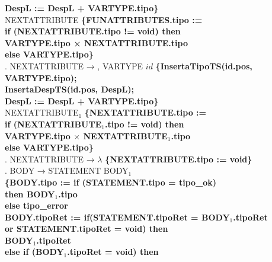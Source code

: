 \begin{tabbing}
    \>                    \>        \>\textbf{DespL := DespL + VARTYPE.tipo\}}\\
    \>                    \>NEXTATTRIBUTE \textbf{\{FUNATTRIBUTES.tipo :=}\\
    \>                    \>                      \> \textbf{if (NEXTATTRIBUTE.tipo != void) then}\\
    \>                    \>                      \> \>\textbf{VARTYPE.tipo × NEXTATTRIBUTE.tipo}\\
    \>                    \>                      \> \textbf{else VARTYPE.tipo\}}\\
    . NEXTATTRIBUTE → , VARTYPE $id$ \textbf{\{InsertaTipoTS(id.pos, VARTYPE.tipo);}\\
    \>                    \>        \>\textbf{InsertaDespTS(id.pos, DespL);}\\
    \>                    \>        \>\textbf{DespL := DespL + VARTYPE.tipo\}}\\
    \>                    \>NEXTATTRIBUTE$_1$ \textbf{\{NEXTATTRIBUTE.tipo :=}\\
    \>                    \>                      \> \textbf{if (NEXTATTRIBUTE$_1$.tipo != void) then}\\
    \>                    \>                      \> \>\textbf{VARTYPE.tipo $\times$ NEXTATTRIBUTE$_1$.tipo}\\
    \>                    \>                      \> \textbf{else VARTYPE.tipo\}}\\
    . NEXTATTRIBUTE → $\lambda$ \textbf{\{NEXTATTRIBUTE.tipo := void\}}\\
    . BODY → STATEMENT BODY$_1$\\
    \>                    \>\textbf{\{BODY.tipo := if (STATEMENT.tipo = tipo\_ok)}\\
    \>                    \>           \>          \>\textbf{then BODY$_1$.tipo}\\
    \>                    \>           \>\textbf{else tipo\_error}\\
    \>                    \>\textbf{BODY.tipoRet := if(STATEMENT.tipoRet = BODY$_1$.tipoRet}\\
    \>                    \>           \>\textbf{or STATEMENT.tipoRet = void) then}\\
    \>                    \>           \>          \>\textbf{BODY$_1$.tipoRet}\\
    \>                    \>           \>\textbf{else if (BODY$_1$.tipoRet = void) then}\\

\end{tabbing}
